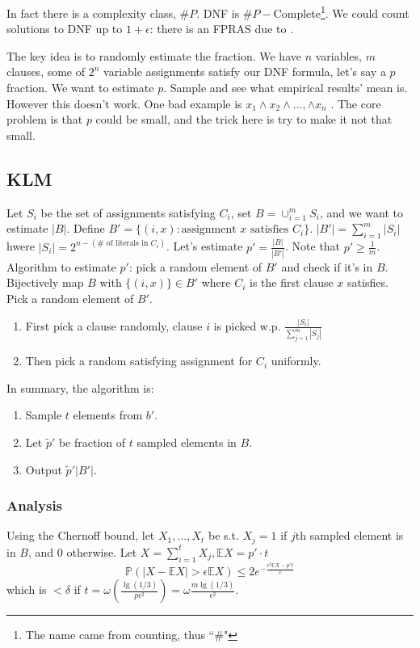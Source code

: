 \documentclass[11pt]{article}
\newcommand{\ep}{\epsilon}
\newcommand{\lqq}{``}
\begin{document}
In fact there is a complexity class, $\#P$. DNF is $\#P-$Complete\footnote{The name came from counting, thus \lqq\#"}. We could count solutions to DNF up to $1+\ep$: there is an FPRAS due to \cite{KarpLM89}.

The key idea is to randomly estimate the fraction. We have $n$ variables, $m$ clauses, some of $2^n$ variable assignments satisfy our DNF formula, let's say a $p$ fraction. We want to estimate $p$. Sample and see what empirical results' mean is. However this doesn't work. One bad example is $x_1\wedge x_2 \wedge ..., \wedge x_n$ . The core problem is that $p$ could be small, and the trick here is try to make it not that small.

\subsection{KLM}

Let $S_i$  be the set of assignments satisfying $C_i$, set $B = \cup_{i=1}^m S_i$, and we want to estimate $|B|$. Define $B' = \{(i,x) : \text{assignment $x$ satisfies $C_i$}\}$. $|B'| = \sum_{i=1}^m |S_i|$ hwere $|S_i| = 2^{n-(\#\text{ of literals in }C_i)}$. Let's estimate $p' = \frac{|B|}{|B'|}$. Note that $p' \ge \frac{1}{m}$. \\

Algorithm to estimate $p'$: pick a random element of $B'$ and check if it's in $B$. Bijectively map $B$ with $\{(i,x)\} \in B'$ where $C_i$ is the first clause $x$ satisfies. Pick a random element of $B'$. 
\begin{enumerate}
\item First pick a clause randomly, clause $i$ is picked w.p. $\frac{|S_i|}{\sum_{j=1}^m |S_j|}$
\item Then pick a random satisfying assignment for $C_i$ uniformly.
\end{enumerate}

In summary, the algorithm is:

\begin{enumerate}
\item Sample $t$ elements from $b'$.
\item Let $\tilde{p}'$ be fraction of $t$ sampled elements in $B$.
\item Output $\tilde{p}' |B'|$.
\end{enumerate}

\subsubsection{Analysis}
Using the Chernoff bound, let $X_1,...,X_t$ be s.t. $X_j = 1$ if $j$th sampled element is in $B$, and $0$ otherwise. Let $X=\sum_{i=1}^{t}{X_j}, \mathbb{E} X = p' \cdot t$
$$\mathbb{P} (|X - \mathbb{E}X| > \ep \mathbb{E}X) \le 2 e^{-\frac{\ep^2 \mathbb{E}X-p't}{c}}$$
which is $< \delta$ if $t=\omega(\frac{\lg(1/3)}{p \ep^2}) = \omega{\frac{m\lg (1/3)}{\ep^2}}$.
\end{document}

